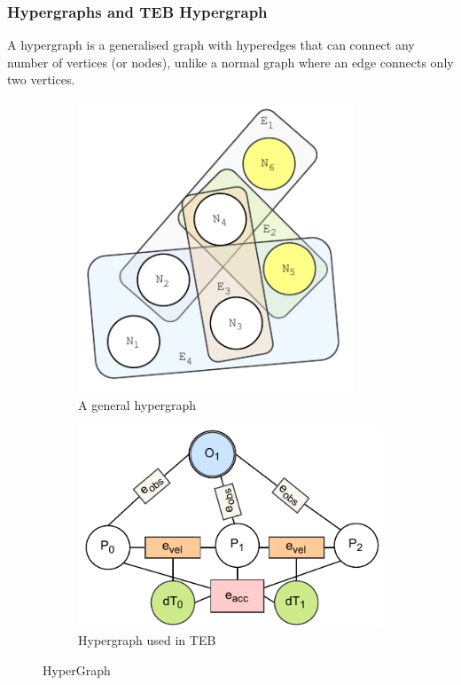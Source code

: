 \subsubsection{Hypergraphs and TEB Hypergraph}
A hypergraph is a generalised graph with hyperedges \cite{bretto2013hypergraph} that can connect any number of vertices (or nodes), unlike a normal graph where an edge connects only two vertices.
\begin{figure}[!h]
    \centering
    \begin{subfigure}[t]{0.45\columnwidth}
        \includegraphics[width=0.9\textwidth]{images/hypergraph.pdf}
    \caption{A general hypergraph}
    \end{subfigure}
     \begin{subfigure}[t]{0.45\columnwidth}
        \includegraphics[width=\textwidth]{images/hypergraph_teb.pdf}
    \caption{Hypergraph used in TEB}
    \end{subfigure}
    \caption{HyperGraph}
    \label{fig:hypergraph}
\end{figure}
